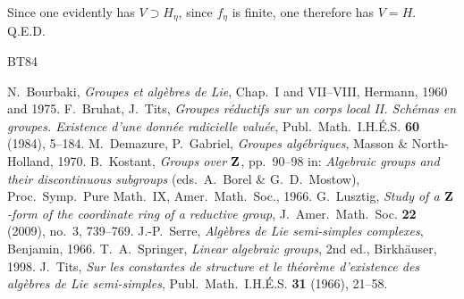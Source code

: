 Since one evidently has $V\supset H_\eta$, since $f_\eta$ is finite, one therefore has $V=H$. Q.E.D.

\begin{thebibliography}{BT84}
\item[]
 N.~Bourbaki, \textit{Groupes et alg\`ebres de Lie}, Chap.~I and VII--VIII, Hermann, 1960 and 1975.
 F.~Bruhat, J.~Tits, \textit{Groupes r\'eductifs sur un corps local II. Sch\'emas en groupes. Existence d'une donn\'ee radicielle valu\'ee}, Publ.~Math.~I.H.\'E.S. \textbf{60} (1984), 5--184.
 M.~Demazure, P.~Gabriel, \textit{Groupes alg\'ebriques}, Masson \& North-Holland, 1970.
 B.~Kostant, \textit{Groups over $\mathbf{Z}$}, pp.~90--98 in: \textit{Algebraic groups and their discontinuous subgroups} (eds.~A.~Borel \& G.~D.~Mostow), Proc.~Symp.~Pure Math.~IX, Amer.~Math.~Soc., 1966.
 G.~Lusztig, \textit{Study of a $\mathbf{Z}$-form of the coordinate ring of a reductive group}, J.~Amer.~Math.~Soc. \textbf{22} (2009), no.~3, 739--769.
 J.-P.~Serre, \textit{Alg\`ebres de Lie semi-simples complexes}, Benjamin, 1966.
 T.~A.~Springer, \textit{Linear algebraic groups}, 2nd ed., Birkh\"auser, 1998.
 J.~Tits, \textit{Sur les constantes de structure et le th\'eor\`eme d'existence des alg\`ebres de Lie semi-simples}, Publ.~Math.~I.H.\'E.S. \textbf{31} (1966), 21--58.
\end{thebibliography}
